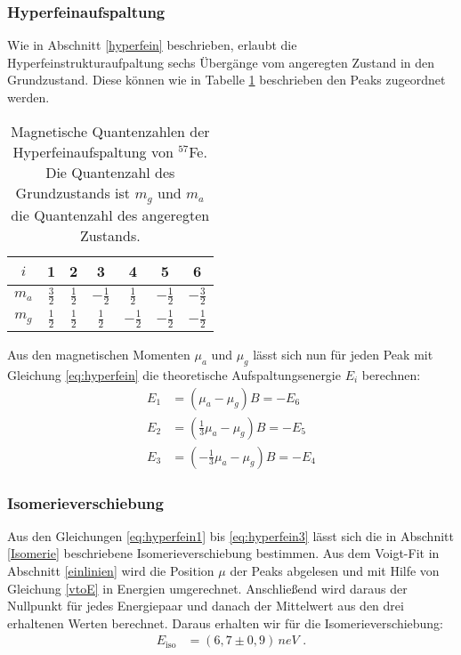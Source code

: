 \subsubsection{Hyperfeinaufspaltung}
Wie in Abschnitt \ref{hyperfein} beschrieben, erlaubt die Hyperfeinstrukturaufpaltung sechs Übergänge vom angeregten Zustand in den Grundzustand. Diese können wie in Tabelle \ref{tab:hyperfein} beschrieben den Peaks zugeordnet werden.

\begin{table}[h!]
	\centering
	\begin{tabular}{c|cccccc}
		$i$&1&2&3&4&5&6\\\hline
		$m_a$&$\frac32$&$\frac12$&$-\frac12$&$\frac12$&$-\frac12$&$-\frac32$\\\hline
		$m_g$&$\frac12$&$\frac12$&$\frac12$&$-\frac12$&$-\frac12$&$-\frac12$
	\end{tabular}
	\caption[Magnetische Quantenzahlen der Hyperfeinaufspaltung von $^{57}$Fe]{Magnetische Quantenzahlen der Hyperfeinaufspaltung von $^{57}$Fe. Die Quantenzahl des Grundzustands ist $m_g$ und $m_a$ die Quantenzahl des angeregten Zustands.}
	\label{tab:hyperfein}
\end{table}

Aus den magnetischen Momenten $\mu_a$ und $\mu_g$ lässt sich nun für jeden Peak mit Gleichung \ref{eq:hyperfein} die theoretische Aufspaltungsenergie $E_i$ berechnen:
\begin{align}
	E_1&=(\mu_a-\mu_g)B=-E_6\label{eq:hyperfein1}\\
	E_2&=(\frac13\mu_a-\mu_g)B=-E_5\label{eq:hyperfein2}\\
	E_3&=(-\frac13\mu_a-\mu_g)B=-E_4\label{eq:hyperfein3}
\end{align}

\subsubsection{Isomerieverschiebung}
Aus den Gleichungen \ref{eq:hyperfein1} bis \ref{eq:hyperfein3} lässt sich die in Abschnitt \ref{Isomerie} beschriebene Isomerieverschiebung bestimmen. Aus dem Voigt-Fit in Abschnitt \ref{einlinien} wird die Position $\mu$ der Peaks abgelesen und mit Hilfe von Gleichung \ref{vtoE} in Energien umgerechnet. Anschließend wird daraus der Nullpunkt für jedes Energiepaar und danach der Mittelwert aus den drei erhaltenen Werten berechnet. Daraus erhalten wir für die Isomerieverschiebung:
\begin{align}
E_\mathrm{iso}&=(6,7\pm0,9)\,\si{neV}\text{ .}
\end{align}

